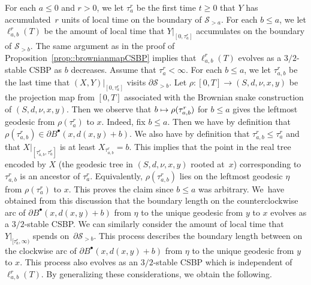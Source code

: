 \documentclass[JEP,XML,SOM,Unicode]{cedram}
\let\mathcal\mathscr
\newcommand\mto{\mathchoice{\longmapsto}{\mapsto}{\mapsto}{\mapsto}}
\newcommand{\sbullet}{{\scriptscriptstyle\bullet}}
\theoremstyle{plain}
\numberwithin{theorem}{section}
\theoremstyle{definition}
\newcommand{\snake}{{\mathcal S}}
\newcommand{\fb}[2]{B^\sbullet(#1,#2)}
\begin{document}
For each $a \leq 0$ and $r > 0$, we let $\tau_a^r$ be the first time $t \geq 0$ that $Y$ has accumulated~$r$ units of local time on the boundary of $\snake_{>a}$. For each $b \leq a$, we let $\ell_{a,b}^r(T)$ be the amount of local time that $Y|_{[0,\tau_a^r]}$ accumulates on the boundary of $\snake_{>b}$. The same argument as in the proof of Proposition~\ref{prop::brownianmapCSBP} implies that $\ell_{a,b}^r(T)$ evolves as a $3/2$-stable CSBP as $b$ decreases. Assume that $\tau_a^r < \infty$. For each $b \leq a$, we let $\tau_{a,b}^r$ be the last time that $(X,Y)|_{[0,\tau_a^r]}$ visits $\partial \snake_{> b}$. Let $\rho \colon [0,T] \to (S,d,\nu,x,y)$ be the projection map from $[0,T]$ associated with the Brownian snake construction of $(S,d,\nu,x,y)$. Then we observe that $b \mto \rho(\tau_{a,b}^r)$ for $b \leq a$ gives the leftmost geodesic from $\rho(\tau_a^r)$ to $x$. Indeed, fix $b \leq a$. Then we have by definition that $\rho(\tau_{a,b}^r) \in \partial \fb{x}{d(x,y)+b}$. We also have by definition that $\tau_{a,b}^r \leq \tau_a^r$ and that $X|_{[\tau_{a,b}^r,\tau_a^r]}$ is at least $X_{\tau_{a,b}^r} = b$. This implies that the point in the real tree encoded by $X$ (the geodesic tree in $(S,d,\nu,x,y)$ rooted at~$x$) corresponding to $\tau_{a,b}^r$ is an ancestor of $\tau_a^r$. Equivalently, $\rho(\tau_{a,b}^r)$ lies on the leftmost geodesic $\eta$ from $\rho(\tau_a^r)$ to $x$. This proves the claim since $b \leq a$ was arbitrary. We~have obtained from this discussion that the boundary length on the counterclockwise arc of $\partial \fb{x}{d(x,y)+b}$ from $\eta$ to the unique geodesic from $y$ to $x$ evolves as a $3/2$\nobreakdash-stable CSBP. We can similarly consider the amount of local time that $Y|_{[\tau_a^r,\infty)}$ spends on~$\partial \snake_{> b}$. This process describes the boundary length between on the clockwise arc of $\partial \fb{x}{d(x,y)+b}$ from $\eta$ to the unique geodesic from $y$ to $x$. This process also evolves as an $3/2$-stable CSBP which is independent of $\ell_{a,b}^r(T)$. By generalizing these considerations, we obtain the following.
\end{document}
